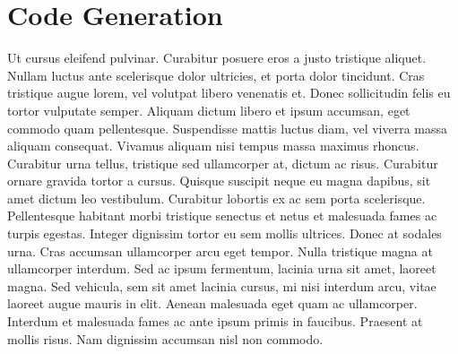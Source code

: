 \section{Code Generation}
Ut cursus eleifend pulvinar. Curabitur posuere eros a justo tristique aliquet. Nullam luctus ante scelerisque dolor ultricies, et porta dolor tincidunt. Cras tristique augue lorem, vel volutpat libero venenatis et. Donec sollicitudin felis eu tortor vulputate semper. Aliquam dictum libero et ipsum accumsan, eget commodo quam pellentesque. Suspendisse mattis luctus diam, vel viverra massa aliquam consequat. Vivamus aliquam nisi tempus massa maximus rhoncus. Curabitur urna tellus, tristique sed ullamcorper at, dictum ac risus. Curabitur ornare gravida tortor a cursus.
Quisque suscipit neque eu magna dapibus, sit amet dictum leo vestibulum. Curabitur lobortis ex ac sem porta scelerisque. Pellentesque habitant morbi tristique senectus et netus et malesuada fames ac turpis egestas. Integer dignissim tortor eu sem mollis ultrices. Donec at sodales urna. Cras accumsan ullamcorper arcu eget tempor. Nulla tristique magna at ullamcorper interdum. Sed ac ipsum fermentum, lacinia urna sit amet, laoreet magna. Sed vehicula, sem sit amet lacinia cursus, mi nisi interdum arcu, vitae laoreet augue mauris in elit. Aenean malesuada eget quam ac ullamcorper. Interdum et malesuada fames ac ante ipsum primis in faucibus. Praesent at mollis risus. Nam dignissim accumsan nisl non commodo.
